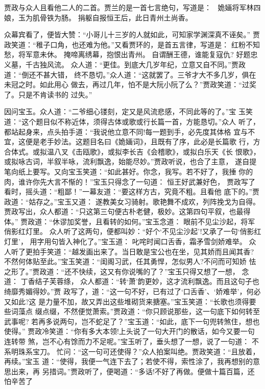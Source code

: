 贾政与众人且看他二人的二首。贾兰的是一首七言绝句，写道是：
姽婳将军林四娘，玉为肌骨铁为肠。
捐躯自报恒王后，此日青州土尚香。

众幕宾看了，便皆大赞：“小哥儿十三岁的人就如此，可知家学渊深真不诬矣。”
贾政笑道：“稚子口角，也还难为他。”又看贾环的，是首五言律，写道是：
红粉不知愁，将军意未休。
掩啼离绣幕，抱恨出青州。
自谓酬王德，谁能复寇仇?
好题忠义墓，千古独风流。
众人道：“更佳。到底大几岁年纪，立意又自不同。”贾政道：“倒还不甚大错，
终不恳切。”众人道：“这就罢了。三爷才大不多几岁，俱在未冠之时。如此用心
做去，再过几年，怕不是大阮小阮了么？”贾政笑道：“过奖了。只是不肯读书的
过失。”

因问宝玉。众人道：“二爷细心镂刻，定又是风流悲感，不同此等的了。”宝
玉笑道：“这个题目似不称近体，须得古体或歌或行长篇一首，方能恳切。”众人
听了，都站起身来，点头拍手道：“我说他立意不同!每一题到手，必先度其体格
宜与不宜，这便是老手妙法。这题目名曰《姽婳词》，且既有了序，此必是长篇歌
行，方合体式。或拟温八叉《击瓯歌》，或拟李长吉《会稽歌》，或拟白乐天《长
恨歌》，或拟咏古词，半叙半咏，流利飘逸，始能尽妙。”贾政听说，也合了主意，
遂自提笔向纸上要写。又向宝玉笑道：“如此甚好。你念，我写。若不好了，我捶
你的肉，谁许你先大言不惭的！”宝玉只得念了一句道：
恒王好武兼好色，
贾政写了看时，摇头道：“粗鄙！”一幕友道：“要这样方古，究竟不粗。且看他
底下的。”贾政道：“姑存之。”宝玉又道：
遂教美女习骑射。歌艳舞不成欢，列阵挽戈为自得。
贾政写出，众人都道：“只这第三句便古朴老健，极妙。这第四句平叙，也最得体。”
贾政道：“休谬加奖誉，且看转的如何。”宝玉念道：
眼前不见尘沙起，将军俏影红灯里。
众人听了这两句，便都叫妙：“好个‘不见尘沙起’!又承了一句‘俏影红灯里’，
用字用句皆入神化了。”宝玉道：
叱咤时闻口舌香，霜矛雪剑娇难举。
众人听了更拍手笑道：“越发画出来了。当日敢是宝公也在坐，见其娇而且闻其香?
不然何体贴至此。”宝玉笑道：“闺阁习武，任其勇悍，怎似男人?不问而可知娇
怯之形了。”贾政道：“还不快续，这又有你说嘴的了？”宝玉只得又想了一想，
念道：
丁香结子芙蓉绦，
众人都道：“转‘萧’韵更妙，这才流利飘逸。而且这句子也绮靡秀媚得妙。”贾
政写了，道：“这一句不好，已有过了‘口舌香’、‘娇难举’，何必又如此?这
是力量不加，故又弄出这些堆砌货来搪塞。”宝玉笑道：“长歌也须得要些词藻点
缀点缀，不然便觉萧索。”贾政道：“你只顾说那些，这一句底下如何转至武事呢?
若再多说两句，岂不蛇足了？”宝玉道：“如此，底下一句兜转煞住，想也使得。”
贾政冷笑道：“你有多大本领!上头说了一句大开门的散话，如今又要一句连转带
煞，岂不心有馀而力不足呢。”宝玉听了，垂头想了一想，说了一句道：
不系明珠系宝刀。
忙问：“这一句可还使得？”众人拍案叫绝。贾政笑道：“且放着，再续。”宝玉
道：“使得，我便一气连下去了；若使不得，索性涂了，我再想别的意思出来，再
另措词。”贾政听了，便喝道：“多话!不好了再做。便做十篇百篇，还怕辛苦了
